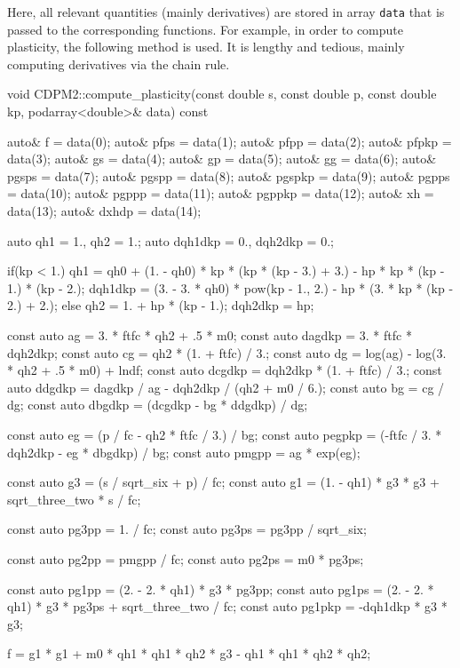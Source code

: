 Here, all relevant quantities (mainly derivatives) are stored in array \texttt{data} that is passed to the corresponding functions. For example, in order to compute plasticity, the following method is used. It is lengthy and tedious, mainly computing derivatives via the chain rule.
\begin{cppcode}
void CDPM2::compute_plasticity(const double s, const double p, const double kp, podarray<double>& data) const {
    auto& f = data(0);
    auto& pfps = data(1);
    auto& pfpp = data(2);
    auto& pfpkp = data(3);
    auto& gs = data(4);
    auto& gp = data(5);
    auto& gg = data(6);
    auto& pgsps = data(7);
    auto& pgspp = data(8);
    auto& pgspkp = data(9);
    auto& pgpps = data(10);
    auto& pgppp = data(11);
    auto& pgppkp = data(12);
    auto& xh = data(13);
    auto& dxhdp = data(14);

    auto qh1 = 1., qh2 = 1.;
    auto dqh1dkp = 0., dqh2dkp = 0.;

    if(kp < 1.) {
        qh1 = qh0 + (1. - qh0) * kp * (kp * (kp - 3.) + 3.) - hp * kp * (kp - 1.) * (kp - 2.);
        dqh1dkp = (3. - 3. * qh0) * pow(kp - 1., 2.) - hp * (3. * kp * (kp - 2.) + 2.);
    }
    else {
        qh2 = 1. + hp * (kp - 1.);
        dqh2dkp = hp;
    }

    const auto ag = 3. * ftfc * qh2 + .5 * m0;
    const auto dagdkp = 3. * ftfc * dqh2dkp;
    const auto cg = qh2 * (1. + ftfc) / 3.;
    const auto dg = log(ag) - log(3. * qh2 + .5 * m0) + lndf;
    const auto dcgdkp = dqh2dkp * (1. + ftfc) / 3.;
    const auto ddgdkp = dagdkp / ag - dqh2dkp / (qh2 + m0 / 6.);
    const auto bg = cg / dg;
    const auto dbgdkp = (dcgdkp - bg * ddgdkp) / dg;

    const auto eg = (p / fc - qh2 * ftfc / 3.) / bg;
    const auto pegpkp = (-ftfc / 3. * dqh2dkp - eg * dbgdkp) / bg;
    const auto pmgpp = ag * exp(eg);

    const auto g3 = (s / sqrt_six + p) / fc;
    const auto g1 = (1. - qh1) * g3 * g3 + sqrt_three_two * s / fc;

    const auto pg3pp = 1. / fc;
    const auto pg3ps = pg3pp / sqrt_six;

    const auto pg2pp = pmgpp / fc;
    const auto pg2ps = m0 * pg3ps;

    const auto pg1pp = (2. - 2. * qh1) * g3 * pg3pp;
    const auto pg1ps = (2. - 2. * qh1) * g3 * pg3ps + sqrt_three_two / fc;
    const auto pg1pkp = -dqh1dkp * g3 * g3;

    f = g1 * g1 + m0 * qh1 * qh1 * qh2 * g3 - qh1 * qh1 * qh2 * qh2;

}
\end{cppcode}
